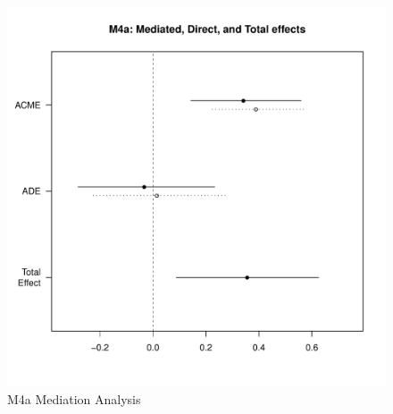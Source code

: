 \documentclass[12pt]{report}
\begin{document}
{\begin{figure}[htbp]
  \centering
  \includegraphics[scale = .5]{../images/MLM4aMediationEffects.pdf}
  \caption{M4a Mediation Analysis}
  \label{fig:MLM4aMediationAnalysis}
\end{figure}



}
\end{document}

